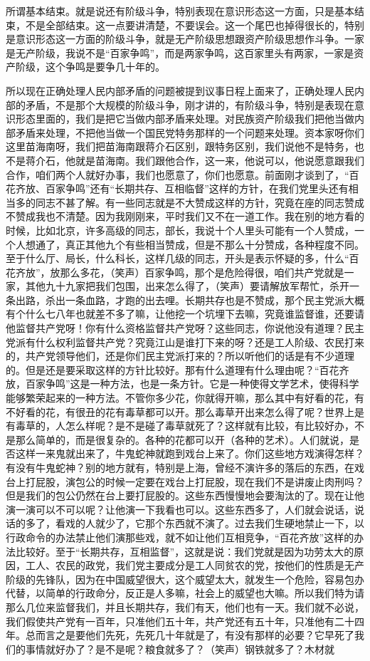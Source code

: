 所谓基本结束。就是说还有阶级斗争，特别表现在意识形态这一方面，只是基本结束，不是全部结束。这一点要讲清楚，不要误会。这一个尾巴也掉得很长的，特别是意识形态这一方面的阶级斗争，就是无产阶级思想跟资产阶级思想作斗争。一家是无产阶级，我说不是“百家争鸣”，而是两家争鸣，这百家里头有两家，一家是资产阶级，这个争鸣是要争几十年的。

所以现在正确处理人民内部矛盾的问题被提到议事日程上面来了，正确处理人民内部的矛盾，不是那个大规模的阶级斗争，刚才讲的，有阶级斗争，特别是表现在意识形态里面的，我们是把它当做内部矛盾来处理。对民族资产阶级我们把他当做内部矛盾来处理，不把他当做一个国民党特务那样的一个问题来处理。资本家呀你们这里苗海南呀，我们把苗海南跟蒋介石区别，跟特务区别，我们说他不是特务，也不是蒋介石，他就是苗海南。我们跟他合作，这一来，他说可以，他说愿意跟我们合作，咱们两个人就好办事，我们也愿意了，你们也愿意。前面刚才谈到了，“百花齐放、百家争鸣”还有“长期共存、互相临督”这样的方针，在我们党里头还有相当多的同志不甚了解。有一些同志就是不大赞成这样的方针，究竟在座的同志赞成不赞成我也不清楚。因为我刚刚来，平时我们又不在一道工作。我在别的地方看的时候，比如北京，许多高级的同志，部长，我说十个人里头可能有一个人赞成，一个人想通了，真正其他九个有些相当赞成，但是不那么十分赞成，各种程度不同。至于什么厅、局长，什么科长，这样几级的同志，开头是表示怀疑的多，什么“百花齐放”，放那么多花，（笑声）百家争鸣，那个是危险得很，咱们共产党就是一家，其他九十九家把我们包围，出来怎么得了，（笑声）要请解放军帮忙，杀开一条出路，杀出一条血路，才跑的出去哩。长期共存也是不赞成，那个民主党派大概有个什么七八年也就差不多了嘛，让他挖一个坑埋下去嘛，究竟谁监督谁，还要请他监督共产党呀！你有什么资格监督共产党呀？这些同志，你说他没有道理？民主党派有什么权利监督共产党？究竟江山是谁打下来的呀？还是工人阶级、农民打来的，共产党领导他们，还是你们民主党派打来的？所以听他们的话是有不少道理的。但是还是要采取这样的方针比较好。那有什么道理有什么理由呢？“百花齐放，百家争鸣”这是一种方法，也是一条方针。它是一种使得文学艺术，使得科学能够繁荣起来的一种方法。不管你多少花，你就得开嘛，那么其中有好看的花，有不好看的花，有很丑的花有毒草都可以开。那么毒草开出来怎么得了呢？世界上是有毒草的，人怎么样呢？是不是碰了毒草就死了？这样就有比较，有比较好办，不是那么简单的，而是很复杂的。各种的花都可以开（各种的艺术）。人们就说，是否这样一来鬼就出来了，牛鬼蛇神就跑到戏台上来了。你们这些地方戏演得怎样？有没有牛鬼蛇神？别的地方就有，特别是上海，曾经不演许多的落后的东西，在戏台上打屁股，演包公的时候一定要在戏台上打屁股，现在我们不是讲废止肉刑吗？但是我们的包公仍然在台上要打屁股的。这些东西慢慢地会要淘汰的了。现在让他演一演可以不可以呢？让他演一下我看也可以。这些东西多了，人们就会说话，说话的多了，看戏的人就少了，它那个东西就不演了。过去我们生硬地禁止一下，以行政命令的办法禁止他们演那些戏，就不如让他们互相竞争，“百花齐放”这样的办法比较好。至于“长期共存，互相监督”，这就是说：我们党就是因为功劳太大的原因，工人、农民的政党，我们党主要成分是工人同贫农的党，按他们的性质是无产阶级的先锋队，因为在中国威望很大，这个威望太大，就发生一个危险，容易包办代替，以简单的行政命分，反正是人多嘛，社会上的威望也大嘛。所以我们特为请那么几位来监督我们，并且长期共存，我们有天，他们也有一天。我们就不必说，我们假使共产党有一百年，只准他们五十年，共产党还有五十年，只准他有二十四年。总而言之是要他们先死，先死几十年就是了，有没有那样的必要？它早死了我们的事情就好办了？是不是呢？粮食就多了？（笑声）钢铁就多了？木材就